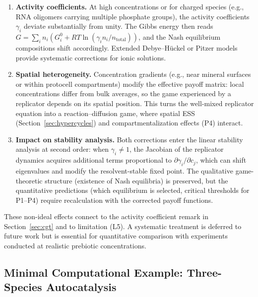 \documentclass[12pt,a4paper]{article}
\theoremstyle{remark}
\begin{document}
\begin{enumerate}
    \item \textbf{Activity coefficients.} At high concentrations or for charged species (e.g., RNA oligomers carrying multiple phosphate groups), the activity coefficients $\gamma_i$ deviate substantially from unity. The Gibbs energy then reads $G = \sum_i n_i (G_i^0 + RT\ln(\gamma_i n_i / n_{\mathrm{total}}))$, and the Nash equilibrium compositions shift accordingly. Extended Debye--H\"uckel or Pitzer models provide systematic corrections for ionic solutions.
    \item \textbf{Spatial heterogeneity.} Concentration gradients (e.g., near mineral surfaces or within protocell compartments) modify the effective payoff matrix: local concentrations differ from bulk averages, so the game experienced by a replicator depends on its spatial position. This turns the well-mixed replicator equation into a reaction--diffusion game, where spatial ESS (Section~\ref{sec:hypercycles}) and compartmentalization effects (P4) interact.
    \item \textbf{Impact on stability analysis.} Both corrections enter the linear stability analysis at second order: when $\gamma_i \neq 1$, the Jacobian of the replicator dynamics acquires additional terms proportional to $\partial\gamma_i/\partial c_j$, which can shift eigenvalues and modify the resolvent-stable fixed point. The qualitative game-theoretic structure (existence of Nash equilibria) is preserved, but the quantitative predictions (which equilibrium is selected, critical thresholds for P1--P4) require recalculation with the corrected payoff functions.
\end{enumerate}

\noindent
These non-ideal effects connect to the activity coefficient remark in Section~\ref{sec:cgt} and to limitation (L5). A systematic treatment is deferred to future work but is essential for quantitative comparison with experiments conducted at realistic prebiotic concentrations.

\subsection{Minimal Computational Example: Three-Species Autocatalysis}\label{sec:3species}
\end{document}
